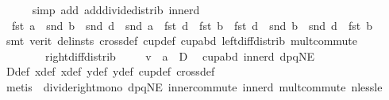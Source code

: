 \begin{isabellebody}
\ \ \ \ \isamarkupfalse%
\ {\isacharparenleft}{\kern0pt}simp\ add{\isacharcolon}{\kern0pt}\ add{\isacharunderscore}{\kern0pt}divide{\isacharunderscore}{\kern0pt}distrib\ inner{\isacharunderscore}{\kern0pt}d{}{\isacharparenright}{\kern0pt}\isanewline
\ \ \isamarkupfalse%
\ {}{\isacharcolon}{\kern0pt}\ {\isachardoublequoteopen}fst\ a\ {\isacharasterisk}{\kern0pt}\ {\isacharparenleft}{\kern0pt}snd\ b\ {\isacharminus}{\kern0pt}\ snd\ d{\isacharparenright}{\kern0pt}\ {\isacharplus}{\kern0pt}\ snd\ a\ {\isacharasterisk}{\kern0pt}\ {\isacharparenleft}{\kern0pt}fst\ d\ {\isacharminus}{\kern0pt}\ fst\ b{\isacharparenright}{\kern0pt}\ {\isachargreater}{\kern0pt}\ fst\ d\ {\isacharasterisk}{\kern0pt}\ snd\ b\ {\isacharminus}{\kern0pt}\ snd\ d\ {\isacharasterisk}{\kern0pt}\ fst\ b{\isachardoublequoteclose}\isanewline
\ \ \ \ \isamarkupfalse%
\ {\isacharparenleft}{\kern0pt}smt\ {\isacharparenleft}{\kern0pt}verit{\isacharcomma}{\kern0pt}\ del{\isacharunderscore}{\kern0pt}insts{\isacharparenright}{\kern0pt}\ cross{}{\isacharunderscore}{\kern0pt}def\ cup{}{\isacharunderscore}{\kern0pt}def\ cup{\isacharunderscore}{\kern0pt}abd\ left{\isacharunderscore}{\kern0pt}diff{\isacharunderscore}{\kern0pt}distrib\ mult{\isachardot}{\kern0pt}commute\isanewline
\ \ \ \ \ \ \ \ right{\isacharunderscore}{\kern0pt}diff{\isacharunderscore}{\kern0pt}distrib{\isacharprime}{\kern0pt}{\isacharparenright}{\kern0pt}\isanewline
\ \ \isamarkupfalse%
\ {}{\isacharcolon}{\kern0pt}\ {\isachardoublequoteopen}v\ {\isasymbullet}\ a\ {\isasymge}\ D{\isachardoublequoteclose}\ \isamarkupfalse%
\ cup{\isacharunderscore}{\kern0pt}abd\ inner{\isacharunderscore}{\kern0pt}d{}\ dpqNE{}\isanewline
\ \ \ \ \ \ \isamarkupfalse%
\ D{\isacharunderscore}{\kern0pt}def\ x{}{\isacharunderscore}{\kern0pt}def\ x{}{\isacharunderscore}{\kern0pt}def\ y{}{\isacharunderscore}{\kern0pt}def\ y{}{\isacharunderscore}{\kern0pt}def\ cup{}{\isacharunderscore}{\kern0pt}def\ cross{}{\isacharunderscore}{\kern0pt}def\isanewline
\ \ \ \ \ \ \isamarkupfalse%
\ {\isacharparenleft}{\kern0pt}metis\ {\isachardoublequoteopen}{}{\isachardoublequoteclose}\ divide{\isacharunderscore}{\kern0pt}right{\isacharunderscore}{\kern0pt}mono\ dpqNE{}\ inner{\isacharunderscore}{\kern0pt}commute\ inner{\isacharunderscore}{\kern0pt}d{}\ mult{\isachardot}{\kern0pt}commute\ nless{\isacharunderscore}{\kern0pt}le{\isacharparenright}{\kern0pt}\isanewline

\end{isabellebody}
